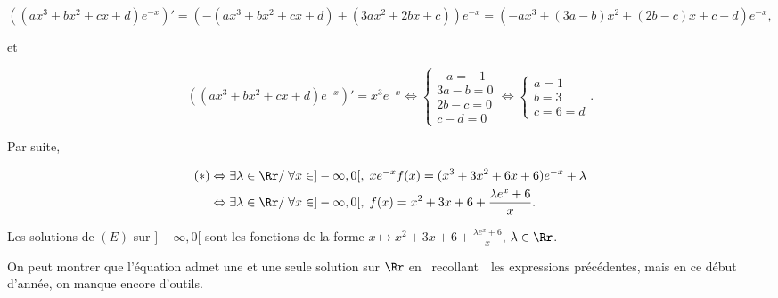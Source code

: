 {{$$((ax^3+bx^2+cx+d)e^{-x})'=(-(ax^3+bx^2+cx+d)+(3ax^2+2bx+c))e^{-x}=(-ax^3+(3a-b)x^2+(2b-c)x+c-d)e^{-x},$$

et

$$((ax^3+bx^2+cx+d)e^{-x})'=x^3e^{-x}\Leftrightarrow
\left\{
\begin{array}{l}
-a=-1\\
3a-b=0\\
2b-c=0\\
c-d=0
\end{array}
\right.
\Leftrightarrow
\left\{
\begin{array}{l}
a=1\\
b=3\\
c=6=d
\end{array}
\right..$$

Par suite,

\begin{align*}\ensuremath
(*)&\Leftrightarrow\exists\lambda\in\Rr/\;\forall x\in]-\infty,0[,\;xe^{-x}f(x)=(x^3+3x^2+6x+6)e^{-x}+\lambda\\
 &\Leftrightarrow\exists\lambda\in\Rr/\;\forall x\in]-\infty,0[,\;
f(x)=x^2+3x+6+\frac{\lambda e^x+6}{x}.
\end{align*}

Les solutions de $(E)$ sur $]-\infty,0[$ sont les fonctions de la forme $x\mapsto x^2+3x+6+\frac{\lambda e^x+6}{x}$,
$\lambda\in\Rr$.

On peut montrer que l'équation admet une et une seule solution sur $\Rr$ en \og~recollant~\fg~les expressions
précédentes, mais en ce début d'année, on manque encore d'outils.
}
}
